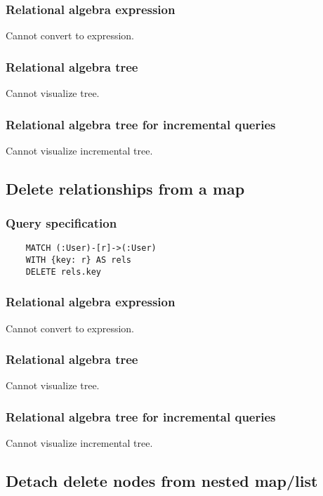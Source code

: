 	\subsubsection*{Relational algebra expression}

	Cannot convert to expression.

	\subsubsection*{Relational algebra tree}

	Cannot visualize tree.

	\subsubsection*{Relational algebra tree for incremental queries}

	Cannot visualize incremental tree.
	\subsection{Delete relationships from a map}

	\subsubsection*{Query specification}

	\begin{lstlisting}
	MATCH (:User)-[r]->(:User)
	WITH {key: r} AS rels
	DELETE rels.key
	\end{lstlisting}


	\subsubsection*{Relational algebra expression}

	Cannot convert to expression.

	\subsubsection*{Relational algebra tree}

	Cannot visualize tree.

	\subsubsection*{Relational algebra tree for incremental queries}

	Cannot visualize incremental tree.
	\subsection{Detach delete nodes from nested map/list}

